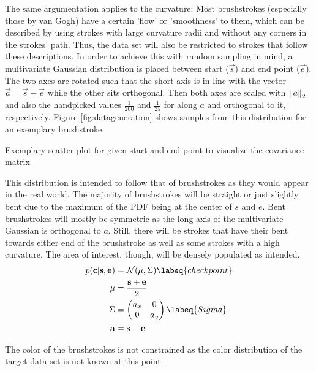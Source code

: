 The same argumentation applies to the curvature:
Most brushstrokes (especially those by van Gogh) have a certain 'flow' or 'smoothness' to them, which can be described by using strokes with large curvature radii and without any corners in the strokes' path.
Thus, the data set will also be restricted to strokes that follow these descriptions.
In order to achieve this with random sampling in mind, a multivariate Gaussian distribution is placed between start ($\vec{s}$) and end point ($\vec{e}$).
The two axes are rotated such that the short axis is in line with the vector
$\vec{a} = \vec{s} - \vec{e}$ while the other sits orthogonal.
Then both axes are scaled with $\left\lVert a\right\rVert_2$ and also the handpicked values $\frac{1}{200}$ and $\frac{1}{25}$ for along $a$ and orthogonal to it, respectively.
Figure \ref{fig:datageneration} shows samples from this distribution for an exemplary brushstroke.
\begin{marginfigure}
    \resizebox{\textwidth}{!}{
        
    }
    \caption[]{Exemplary scatter plot for given start and end point to visualize the covariance matrix}
\end{marginfigure}
This distribution is intended to follow that of brushstrokes as they would appear in the real world.
The majority of brushstrokes will be straight or just slightly bent due to the maximum of the PDF being at the center of $s$ and $e$.
Bent brushstrokes will mostly be symmetric as the long axis of the multivariate Gaussian is orthogonal to $a$.
Still, there will be strokes that have their bent towards either end of the brushstroke as well as some strokes with a high curvature.
The area of interest, though, will be densely populated as intended.
\begin{align}
    p(\vec{c}| \vec{s}, \vec{e}) & = \mathcal{N}(\mu, \Sigma) \labeq{checkpoint} \\
    \mu & = \frac{\vec{s} + \vec{e}}{2} \\
    \Sigma & =
        \begin{pmatrix}
            a_x & 0 \\
            0 & a_y
        \end{pmatrix} \labeq{Sigma}\\
    \vec{a} & = \vec{s} - \vec{e}
\end{align}

The color of the brushstrokes is not constrained as the color distribution of the target data set is not known at this point. 



